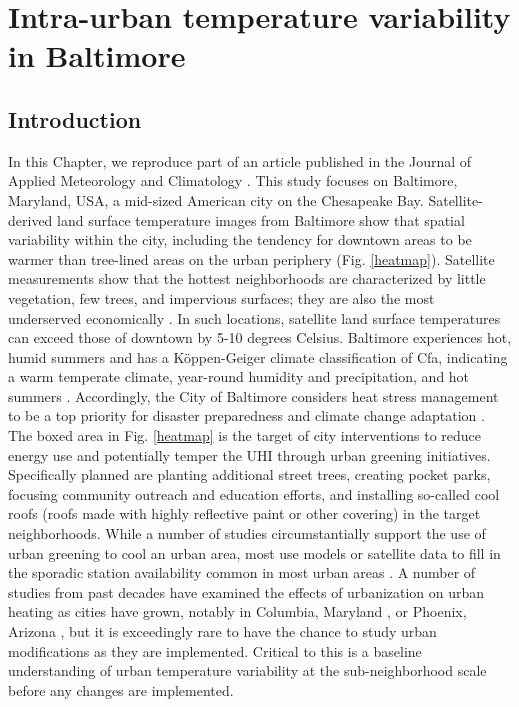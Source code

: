 \chapter{Intra-urban temperature variability in Baltimore}
\label{chap:bmore1}
\section{Introduction}
In this Chapter, we reproduce part of an article published in the Journal of Applied Meteorology and Climatology \citep{scott2017intraurban}. This study focuses on Baltimore, Maryland, USA, a mid-sized American city on the Chesapeake Bay. Satellite-derived land surface temperature images from Baltimore show that spatial variability within the city, including the tendency for downtown areas to be warmer than tree-lined areas on the urban periphery (Fig. \ref{heatmap}). Satellite measurements show that the hottest neighborhoods are characterized by little vegetation, few trees, and impervious surfaces; they are also the most underserved economically \citep{Huang20111753}. In such locations, satellite land surface temperatures can exceed those of downtown by 5-10 degrees Celsius. Baltimore experiences hot, humid summers and has a K{\"o}ppen-Geiger climate classification of Cfa, indicating a warm temperate climate, year-round humidity and precipitation, and hot summers \citep{koppengeigerUpdated}. Accordingly, the City of Baltimore considers heat stress management to be a top priority for disaster preparedness and climate change adaptation \citep{baltimoreheatpriority}. The boxed area in Fig. \ref{heatmap} is the target of city interventions to reduce energy use and potentially temper the UHI through urban greening initiatives. Specifically planned are planting additional street trees, creating pocket parks, focusing community outreach and education efforts, and installing so-called cool roofs (roofs made with highly reflective paint or other covering) in the target neighborhoods. While a number of studies circumstantially support the use of urban greening to cool an urban area, most use models or satellite data to fill in the sporadic station availability common in most urban areas \citep{urbangreeningreview}. A number of studies from past decades have examined the effects of urbanization on urban heating as cities have grown, notably in Columbia, Maryland \citep{columbiaUHIlandsberg}, or Phoenix, Arizona \citep{phoenixUHI}, but it is exceedingly rare to have the chance to study urban modifications as they are implemented. Critical to this is a baseline understanding of urban temperature variability at the sub-neighborhood scale before any changes are implemented. 

